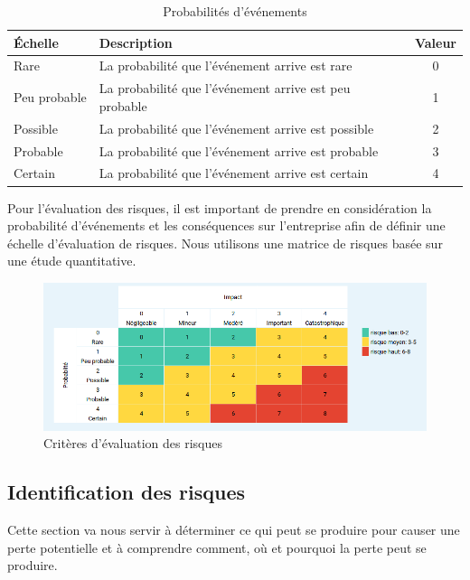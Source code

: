 \begin{table}[H]
	\centering
	\begin{tabular}{llc}
		\hline
		Échelle      & Description                                            & Valeur \\ \hline
		Rare         & La probabilité que l'événement arrive est rare         & 0      \\
		Peu probable & La probabilité que l'événement arrive est peu probable & 1      \\
		Possible     & La probabilité que l'événement arrive est possible     & 2      \\
		Probable     & La probabilité que l'événement arrive est probable     & 3      \\
		Certain      & La probabilité que l'événement arrive est certain      & 4      \\ \hline
	\end{tabular}
\caption{Probabilités d'événements}
\end{table}

Pour l'évaluation des risques, il est important de prendre en considération la probabilité d'événements et les conséquences sur l'entreprise afin de définir une échelle d'évaluation de risques. Nous utilisons une matrice de risques basée sur une étude quantitative.

\begin{figure}[H]
	\centering
	\includegraphics[width=15.5cm]{images/risque_evaluation.png}
	\centering
	\caption{Critères d'évaluation des risques \label{Critères d'évaluation des risques}}
\end{figure}

\subsection{Identification des risques}
Cette section va nous servir à déterminer ce qui peut se produire pour causer une perte potentielle et à comprendre comment, où et pourquoi la perte peut se produire. 

